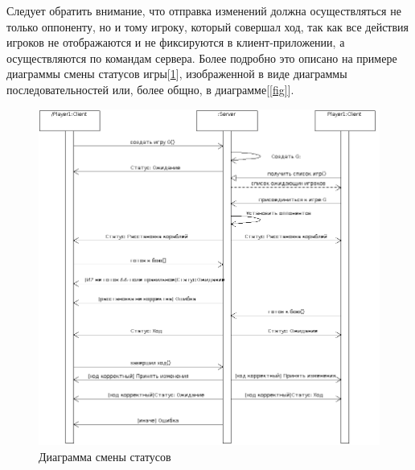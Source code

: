  Следует обратить внимание, что отправка изменений должна осуществляться не только оппоненту, но и тому игроку, который совершал ход, так как все действия игроков не отображаются и не фиксируются в клиент-приложении, а осуществляются по командам сервера. Более подробно это описано на примере диаграммы смены статусов игры[\ref{fig17}], изображенной в виде диаграммы последовательностей или, более общно, в диаграмме[\ref{fig}].

\begin{figure}[htp]
\centering
\includegraphics[width=18cm]{images/srvstate.png}
\caption{Диаграмма смены статусов}
\label{fig17}
\end{figure}

